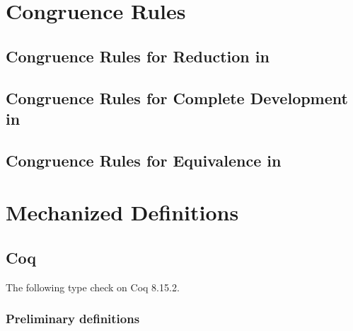 \chapter{Congruence Rules} \label{app:cong}

\section{Congruence Rules for Reduction in \lang} \label{app:cong:red}


\section{Congruence Rules for Complete Development in \lang} \label{app:cong:develop}

\vfill %

\section{Congruence Rules for Equivalence in \CICE} \label{app:cong:equiv}


\chapter{Mechanized \CICE Definitions} \label{app:mechanization}

\section{Coq}

\renewcommand{\ttfamily}{\codefont}

The following type check on Coq 8.15.2.

\subsection{Preliminary definitions} \label{app:mechanization:coq:prelim}

